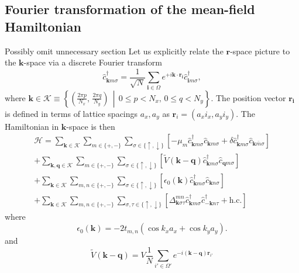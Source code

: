 \subsection{Fourier transformation of the mean-field Hamiltonian}
{\color{red} Possibly omit unnecessary section}
Let us explicitly relate the $\mathbf{r}$-space picture to the $\mathbf{k}$-space via a discrete Fourier transform
\begin{equation}
\hat c_{\mathbf{k} m \sigma}^\dagger = \frac{1}{\sqrt{N}} \sum_{\mathbf{i}\in\Omega} e^{+i \mathbf{k}\cdot \mathbf{r}_\mathbf{i}}\hat c_{\mathbf{i} m \sigma}^\dagger,
\end{equation}
where $\mathbf{k} \in \mathcal{K}\equiv\left\{ \left( \frac{2\pi p}{N_x}, \, \frac{2\pi q}{N_y} \right)\, \middle |\, 0\leqslant p < N_x, \, 0\leqslant q < N_y \right\}$. The position vector $\mathbf{r}_\mathbf{i}$ is defined in terms of lattice spacings $a_x, a_y$ as $\mathbf{r}_i=(a_x i_x, a_y i_y)$. The Hamiltonian in $\mathbf{k}$-space is then
\begin{multline}
\mathcal H = \sum_{\mathbf{k}\in\mathcal{K}}\sum_{m\in\{+,-\}}\sum_{\sigma\in\{\uparrow,\downarrow\}}
\left[
-\mu_m \hat c_{\mathbf{k} m \sigma}^\dagger\hat c_{\mathbf{k} m \sigma} 
+ \delta\hat c_{\mathbf{k} m \sigma}^\dagger \hat c_{\mathbf{k} \bar{m} \sigma}
\right]\\
+
\sum_{\mathbf{k},\mathbf{q}\in\mathcal{K}}\sum_{m\in\{+,-\}}\sum_{\sigma\in\{\uparrow,\downarrow\}}
\left[
\tilde V(\mathbf{k}-\mathbf{q})\hat  c_{\mathbf{k} m \sigma}^\dagger\hat c_{\mathbf{q} m \sigma} 
\right]\\
+\sum_{\mathbf{k}\in\mathcal{K}}\sum_{m,n\in\{+,-\}}\sum_{\sigma\in\{\uparrow,\downarrow\}}
\left[
\epsilon_0 (\mathbf{k})\hat c_{\mathbf{k} m \sigma}^\dagger \hat c_{\mathbf{k} n\sigma}
\right]\\
+
\sum_{\mathbf{k}\in\mathcal{K}}\sum_{m,n\in\{+,-\}}\sum_{\sigma,\tau\in\{\uparrow,\downarrow\}}\left[
\Delta_{\mathbf{k}\sigma\tau}^{mn}\hat c_{\mathbf{k} m \sigma}^\dagger\hat c_{-\mathbf{k} n \tau}^\dagger +\text{h.c.}
\right]
\end{multline}
where 
\begin{equation}
\epsilon_0(\mathbf{k}) = -2 t_{m,n} \left( \cos{k_x a_x} + \cos{k_y a_y}\right).
\label{eq:normal_dispersion}
\end{equation} 
and 
\begin{equation}
\tilde V(\mathbf{k}-\mathbf{q}) = V\frac{1}{N}\sum_{i'\in\Omega'}e^{-i(\mathbf{k}-\mathbf{q})\mathbf{r}_{i'}}
\end{equation}

